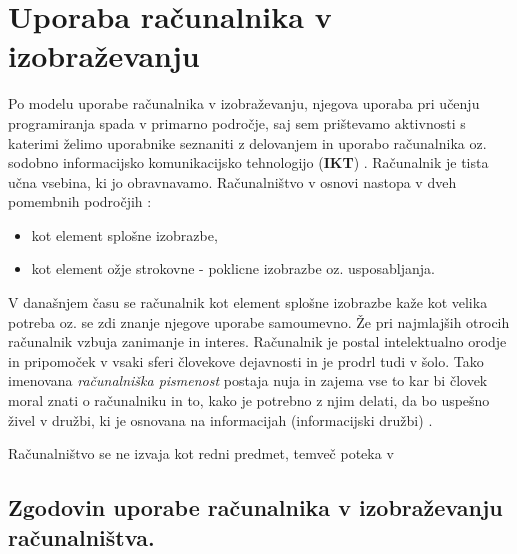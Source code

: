 



\section{Uporaba računalnika v izobraževanju}
\label{sec:uporaba-raunalnika-v}

Po modelu uporabe računalnika v izobraževanju, njegova uporaba pri
učenju programiranja spada v primarno področje, saj sem prištevamo
aktivnosti s katerimi želimo uporabnike seznaniti z delovanjem in
uporabo računalnika oz. sodobno informacijsko komunikacijsko
tehnologijo (\textbf{IKT}) \cite{model_uporabe_rac_izo-web}. Računalnik
je tista učna vsebina, ki jo obravnavamo. Računalništvo v osnovi
nastopa v dveh pomembnih področjih \cite{gerlic_2000}:

\begin{itemize}
\item kot element splošne izobrazbe,
\item kot element ožje strokovne - poklicne izobrazbe
  oz. usposabljanja.
\end{itemize}

V današnjem času se računalnik kot element splošne izobrazbe kaže kot
velika potreba oz. se zdi znanje njegove uporabe samoumevno. Že pri
najmlajših otrocih računalnik vzbuja zanimanje in interes.  Računalnik
je postal intelektualno orodje in pripomoček v vsaki sferi človekove
dejavnosti in je prodrl tudi v šolo. Tako imenovana \emph{računalniška
  pismenost} postaja nuja in zajema vse to kar bi človek moral znati o
računalniku in to, kako je potrebno z njim delati, da bo uspešno živel
v družbi, ki je osnovana na informacijah (informacijski družbi)
\cite{klemencic_2011}.



Računalništvo se ne izvaja kot redni predmet, temveč poteka v


\subsection{Zgodovin uporabe računalnika v izobraževanju
računalništva.}\label{zgodovina_uporabe_racunalnika_v_izobrazevanju}

